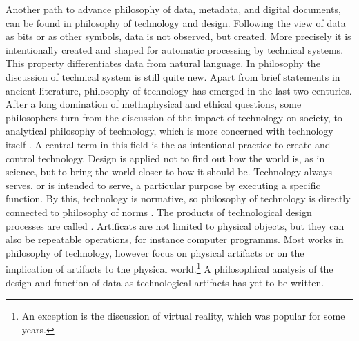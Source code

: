 Another path to advance philosophy of data, metadata, and digital documents,
can be found in philosophy of technology and design. Following the view of
data as bits or as other symbols, data is not observed, but created. More
precisely it is intentionally created and shaped for automatic processing
by technical systems. This property differentiates data from natural language.
In philosophy the discussion of technical system is still quite new.
Apart from brief statements in ancient literature, philosophy of technology 
has emerged in the last two centuries. After a long domination of methaphysical
and ethical questions, some philosophers turn from the discussion of the impact
of technology on society, to analytical philosophy of technology, which is more
concerned with technology itself \cite{Franssen2009}. A central term in this
field is the  as intentional practice to create and control
technology. Design is applied not to find out how the world is, as in science,
but to bring the world closer to how it should be. Technology always serves, or
is intended to serve, a particular purpose by executing a specific function.
By this, technology is normative, so philosophy of technology is directly 
connected to philosophy of norms \cite{Vaesen2008}.  
The products of technological design processes are called .
Artificats are not limited to physical objects, but they can also be repeatable
operations, for instance computer programms. Most works in philosophy of 
technology, however focus on physical artifacts or on the implication of
artifacts to the physical world.\footnote{An exception is the discussion
of virtual reality, which was popular for some years. 
}
A philosophical analysis of the design and function of data as technological
artifacts has yet to be written.

%
%
% 

